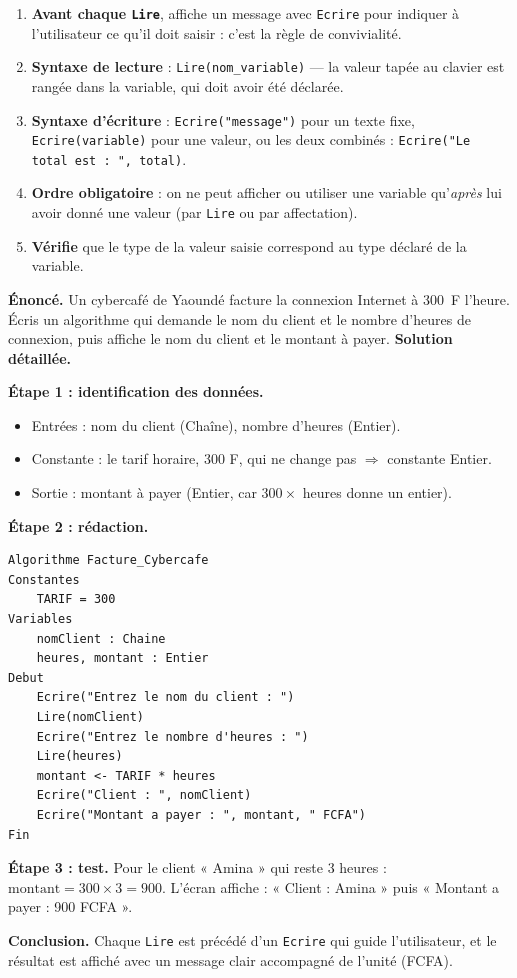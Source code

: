 \documentclass[11pt]{article}
\begin{document}
\begin{methode}
\begin{enumerate}
  \item \textbf{Avant chaque \texttt{Lire}}, affiche un message avec \texttt{Ecrire} pour indiquer à l'utilisateur ce qu'il doit saisir : c'est la règle de convivialité.
  \item \textbf{Syntaxe de lecture} : \texttt{Lire(nom\_variable)} — la valeur tapée au clavier est rangée dans la variable, qui doit avoir été déclarée.
  \item \textbf{Syntaxe d'écriture} : \texttt{Ecrire("message")} pour un texte fixe, \texttt{Ecrire(variable)} pour une valeur, ou les deux combinés : \texttt{Ecrire("Le total est : ", total)}.
  \item \textbf{Ordre obligatoire} : on ne peut afficher ou utiliser une variable qu'\emph{après} lui avoir donné une valeur (par \texttt{Lire} ou par affectation).
  \item \textbf{Vérifie} que le type de la valeur saisie correspond au type déclaré de la variable.
\end{enumerate}
\end{methode}

\begin{exoresolu}
\textbf{Énoncé.} Un cybercafé de Yaoundé facture la connexion Internet à \SI{300}{F} l'heure. Écris un algorithme qui demande le nom du client et le nombre d'heures de connexion, puis affiche le nom du client et le montant à payer.
\tcblower
\textbf{Solution détaillée.}

\textbf{Étape 1 : identification des données.}
\begin{itemize}
  \item Entrées : nom du client (Chaîne), nombre d'heures (Entier).
  \item Constante : le tarif horaire, 300 F, qui ne change pas $\Rightarrow$ constante Entier.
  \item Sortie : montant à payer (Entier, car $300 \times$ heures donne un entier).
\end{itemize}

\textbf{Étape 2 : rédaction.}
\begin{lstlisting}
Algorithme Facture_Cybercafe
Constantes
    TARIF = 300
Variables
    nomClient : Chaine
    heures, montant : Entier
Debut
    Ecrire("Entrez le nom du client : ")
    Lire(nomClient)
    Ecrire("Entrez le nombre d'heures : ")
    Lire(heures)
    montant <- TARIF * heures
    Ecrire("Client : ", nomClient)
    Ecrire("Montant a payer : ", montant, " FCFA")
Fin
\end{lstlisting}

\textbf{Étape 3 : test.} Pour le client « Amina » qui reste 3 heures : $\text{montant} = 300 \times 3 = 900$. L'écran affiche : « Client : Amina » puis « Montant a payer : 900 FCFA ».

\textbf{Conclusion.} Chaque \texttt{Lire} est précédé d'un \texttt{Ecrire} qui guide l'utilisateur, et le résultat est affiché avec un message clair accompagné de l'unité (FCFA).
\end{exoresolu}
\end{document}
